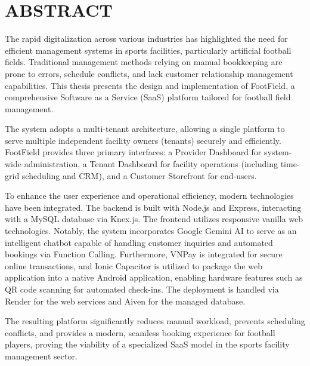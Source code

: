 \section*{ABSTRACT}
The rapid digitalization across various industries has highlighted the need for efficient management systems in sports facilities, particularly artificial football fields. Traditional management methods relying on manual bookkeeping are prone to errors, schedule conflicts, and lack customer relationship management capabilities. This thesis presents the design and implementation of FootField, a comprehensive Software as a Service (SaaS) platform tailored for football field management.

The system adopts a multi-tenant architecture, allowing a single platform to serve multiple independent facility owners (tenants) securely and efficiently. FootField provides three primary interfaces: a Provider Dashboard for system-wide administration, a Tenant Dashboard for facility operations (including time-grid scheduling and CRM), and a Customer Storefront for end-users.

To enhance the user experience and operational efficiency, modern technologies have been integrated. The backend is built with Node.js and Express, interacting with a MySQL database via Knex.js. The frontend utilizes responsive vanilla web technologies. Notably, the system incorporates Google Gemini AI to serve as an intelligent chatbot capable of handling customer inquiries and automated bookings via Function Calling. Furthermore, VNPay is integrated for secure online transactions, and Ionic Capacitor is utilized to package the web application into a native Android application, enabling hardware features such as QR code scanning for automated check-ins. The deployment is handled via Render for the web services and Aiven for the managed database.

The resulting platform significantly reduces manual workload, prevents scheduling conflicts, and provides a modern, seamless booking experience for football players, proving the viability of a specialized SaaS model in the sports facility management sector.
\newpage
\cleardoublepage